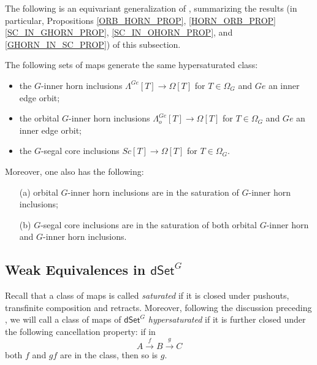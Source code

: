 \documentclass[a4paper,10p,draft]{article}%
\numberwithin{equation}{section}%
\begin{document}
The following is an equivariant generalization of 
\cite[Props. 2.4 and 2.5]{CM13a},
summarizing the results
(in particular, Propositions \ref{ORB_HORN_PROP}, \ref{HORN_ORB_PROP} \ref{SC_IN_GHORN_PROP}, \ref{SC_IN_OHORN_PROP}, and \ref{GHORN_IN_SC_PROP})
of this subsection.

\begin{proposition}\label{HYPER PROP}
The following sets of maps generate the same hypersaturated class:
\begin{itemize}
\item the $G$-inner horn inclusions
$\Lambda^{Ge} [T] \to \Omega[T]$ for $T \in \Omega_G$ and $Ge$ an inner edge orbit; 
\item the orbital $G$-inner horn inclusions
$\Lambda^{Ge}_o [T] \to \Omega[T]$ for $T \in \Omega_G$ and $Ge$ an inner edge orbit; 
\item the $G$-segal core inclusions
$Sc [T] \to \Omega[T]$ for $T \in \Omega_G$.
\end{itemize}
Moreover, one also has the following:
\begin{itemize}
	\item[(a)] orbital $G$-inner horn inclusions are in the saturation of $G$-inner horn inclusions;
	\item[(b)] $G$-segal core inclusions are in the saturation of both orbital $G$-inner horn and $G$-inner horn inclusions.
\end{itemize}
\end{proposition}



















\subsection{Weak Equivalences in $\mathsf{dSet}^G$}

Recall that a class of maps is called \textit{saturated}
if it is closed under pushouts, transfinite composition and retracts.
Moreover, following the discussion preceding \cite[Prop. 3.6.8]{HHM16}, we will call a class of maps of $\mathsf{dSet}^G$ \textit{hypersaturated} if it is further closed under the following cancellation property: if in
\[
A \xrightarrow{f} B \xrightarrow{g} C
\]
both $f$ and $gf$ are in the class, then so is $g$.
\end{document}
